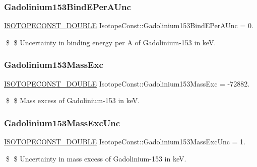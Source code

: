 \subsubsection{\texorpdfstring{Gadolinium153\+Bind\+E\+Per\+A\+Unc}{Gadolinium153BindEPerAUnc}}
{\footnotesize\ttfamily \mbox{\hyperlink{group___isotope_const-_macros_ga8f45a7272ce02c0b4c65c44636ed719a}{I\+S\+O\+T\+O\+P\+E\+C\+O\+N\+S\+T\+\_\+\+D\+O\+U\+B\+LE}} Isotope\+Const\+::\+Gadolinium153\+Bind\+E\+Per\+A\+Unc = 0.}

\$ \$ Uncertainty in binding energy per A of Gadolinium-\/153 in keV. \mbox{\label{group___isotope_const-_gadolinium-_gd153_ga9b73aa0a64ba0e5214cb04aba2e85976}} 
\subsubsection{\texorpdfstring{Gadolinium153\+Mass\+Exc}{Gadolinium153MassExc}}
{\footnotesize\ttfamily \mbox{\hyperlink{group___isotope_const-_macros_ga8f45a7272ce02c0b4c65c44636ed719a}{I\+S\+O\+T\+O\+P\+E\+C\+O\+N\+S\+T\+\_\+\+D\+O\+U\+B\+LE}} Isotope\+Const\+::\+Gadolinium153\+Mass\+Exc = -\/72882.}

\$ \$ Mass excess of Gadolinium-\/153 in keV. \mbox{\label{group___isotope_const-_gadolinium-_gd153_ga2f476d1a383579f4496be8a54d013adb}} 
\subsubsection{\texorpdfstring{Gadolinium153\+Mass\+Exc\+Unc}{Gadolinium153MassExcUnc}}
{\footnotesize\ttfamily \mbox{\hyperlink{group___isotope_const-_macros_ga8f45a7272ce02c0b4c65c44636ed719a}{I\+S\+O\+T\+O\+P\+E\+C\+O\+N\+S\+T\+\_\+\+D\+O\+U\+B\+LE}} Isotope\+Const\+::\+Gadolinium153\+Mass\+Exc\+Unc = 1.}

\$ \$ Uncertainty in mass excess of Gadolinium-\/153 in keV. \mbox{\label{group___isotope_const-_gadolinium-_gd153_ga18f2520fdc24f6429e063ebe1fe5f20f}} 

